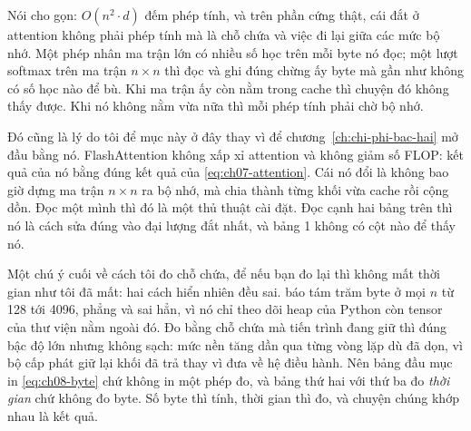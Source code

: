 Nói cho gọn: \(O(n^2 \cdot d)\) đếm phép tính, và trên phần cứng thật, cái đắt ở
attention không phải phép tính mà là chỗ chứa và việc đi lại giữa các mức bộ
nhớ. Một phép nhân ma trận lớn có nhiều số học trên mỗi byte nó đọc; một lượt
softmax trên ma trận \(n \times n\) thì đọc và ghi đúng chừng ấy byte mà gần như
không có số học nào để bù. Khi ma trận ấy còn nằm trong cache thì chuyện đó
không thấy được. Khi nó không nằm vừa nữa thì mỗi phép tính phải chờ bộ nhớ.

%
Đó cũng là lý do tôi để mục này ở đây thay vì để chương~\ref{ch:chi-phi-bac-hai}
mở đầu bằng nó. FlashAttention không xấp xỉ attention và không giảm số FLOP:
kết quả của nó bằng đúng kết quả của \eqref{eq:ch07-attention}. Cái nó đổi là
không bao giờ dựng ma trận \(n \times n\) ra bộ nhớ, mà chia thành từng khối vừa
cache rồi cộng dồn. Đọc một mình thì đó là một thủ thuật cài đặt. Đọc cạnh hai
bảng trên thì nó là cách sửa đúng vào đại lượng đắt nhất, và bảng 1 không có cột
nào để thấy nó.

Một chú ý cuối về cách tôi đo chỗ chứa, để nếu bạn đo lại thì không mất thời
gian như tôi đã mất: hai cách hiển nhiên đều sai.  báo tám trăm byte ở mọi \(n\) từ
128 tới 4096, phẳng và sai hẳn, vì nó chỉ theo dõi heap của Python còn tensor
của thư viện nằm ngoài đó. Đo bằng chỗ chứa mà tiến trình đang giữ thì đúng bậc
độ lớn nhưng không sạch: mức nền tăng dần qua từng vòng lặp dù đã dọn, vì bộ cấp
phát giữ lại khối đã trả thay vì đưa về hệ điều hành. Nên bảng đầu mục in
\eqref{eq:ch08-byte} chứ không in một phép đo, và bảng thứ hai với thứ ba đo
\emph{thời gian} chứ không đo byte. Số byte thì tính, thời gian thì đo, và
chuyện chúng khớp nhau là kết quả.
